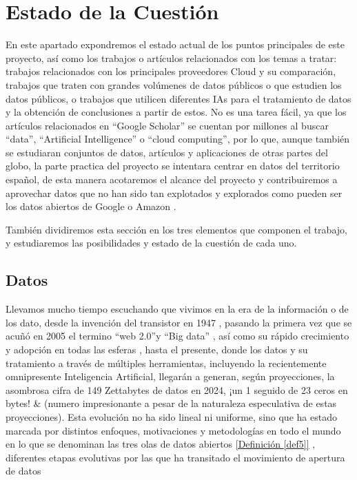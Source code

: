 \chapter{Estado de la Cuestión}
\label{cap:estadoDeLaCuestion}


\vspace{1cm}

En este apartado expondremos el estado actual de los puntos principales de este proyecto, así como los trabajos o artículos relacionados con los temas a tratar: trabajos relacionados con los principales proveedores Cloud y su comparación, trabajos que traten con grandes volúmenes de datos públicos o que estudien los datos públicos, o trabajos que utilicen diferentes IAs para el tratamiento de datos y la obtención de conclusiones a partir de estos. No es una tarea fácil, ya que los artículos relacionados en ``Google Scholar'' se cuentan por millones al buscar ``data'', ``Artificial Intelligence'' o ``cloud computing'', por lo que, aunque también se estudiaran conjuntos de datos, artículos y aplicaciones de otras partes del globo, la parte practica del proyecto se intentara centrar en datos del territorio español, de esta manera acotaremos el alcance del proyecto y contribuiremos a aprovechar datos que no han sido tan explotados y explorados como pueden ser los datos abiertos de Google \citep{googleDataCommon} o Amazon \citep{AWSDataCommon}. 

También dividiremos esta sección en los tres elementos que componen el trabajo, y estudiaremos las posibilidades y estado de la cuestión de cada uno. \newpage

\section{Datos}
\label{sec:EstudiosDatos}

Llevamos mucho tiempo escuchando que vivimos en la era de la información o de los dato, desde la invención del transistor en 1947 \citep{wikiInformationAge}, pasando la primera vez que se acuñó en 2005 el termino ``web 2.0''y ``Big data'' \citep{HistoryOfBigData}, así como su rápido crecimiento y adopción en todas las esferas \citep{brown2011you}, hasta el presente, donde los datos y su tratamiento a través de múltiples herramientas, incluyendo la recientemente omnipresente Inteligencia Artificial, llegarán a generan, según proyecciones, la asombrosa cifra de 149 Zettabytes de datos en 2024, ¡un 1 seguido de 23 ceros en bytes! \citep{BigDataStatista} \& \citep{BigDataStadisticsMarket} (numero impresionante a pesar de la naturaleza especulativa de estas proyecciones). 
Esta evolución no ha sido lineal ni uniforme, sino que ha estado marcada por distintos enfoques, motivaciones y metodologías en todo el mundo en lo que se denominan las tres olas de datos abiertos \hyperref[def5]{[Definición \ref*{def5}]} , diferentes etapas evolutivas por las que ha transitado el movimiento de apertura de datos

